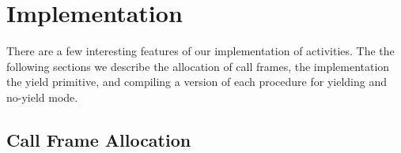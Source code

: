 \documentclass[9pt,preprint]{sigplanconf}
\begin{document}




\section{Implementation}

There are a few interesting features of our implementation of activities.
The the following sections we describe the allocation of call frames, the implementation the yield primitive, and compiling a version of each procedure for yielding and no-yield mode.

\subsection{Call Frame Allocation}
\end{document}
